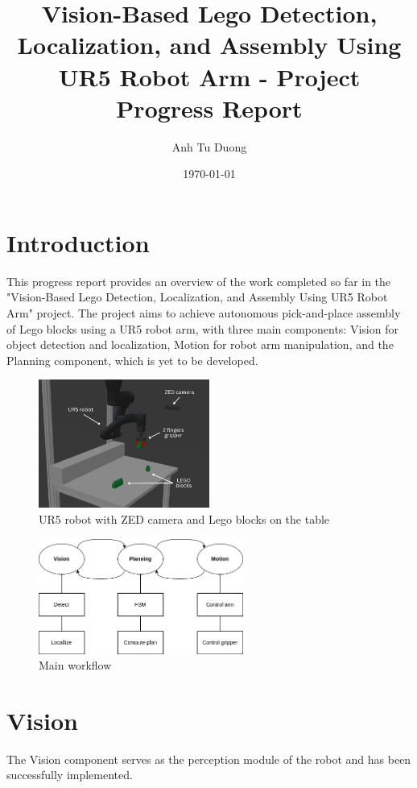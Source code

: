 \documentclass{article}
\title{Vision-Based Lego Detection, Localization, and Assembly Using UR5 Robot Arm - Project Progress Report}
\author{Anh Tu Duong}
\date{\today}
\begin{document}
	
	\maketitle
	
	\section{Introduction}
	This progress report provides an overview of the work completed so far in the "Vision-Based Lego Detection, Localization, and Assembly Using UR5 Robot Arm" project. The project aims to achieve autonomous pick-and-place assembly of Lego blocks using a UR5 robot arm, with three main components: Vision for object detection and localization, Motion for robot arm manipulation, and the Planning component, which is yet to be developed.
	
	\begin{figure}[H]
		\centering
		\includegraphics[width=0.5\textwidth]{images/scene-start.png}
		\caption{UR5 robot with ZED camera and Lego blocks on the table}
		\label{fig:scene-start}
	\end{figure}
	
	\begin{figure}[H]
		\centering
		\includegraphics[width=0.6\textwidth]{images/design-main.png}
		\caption{Main workflow}
		\label{fig:design-main}
	\end{figure}
	
	\section{Vision}
	The Vision component serves as the perception module of the robot and has been successfully implemented.
	
\end{document}
